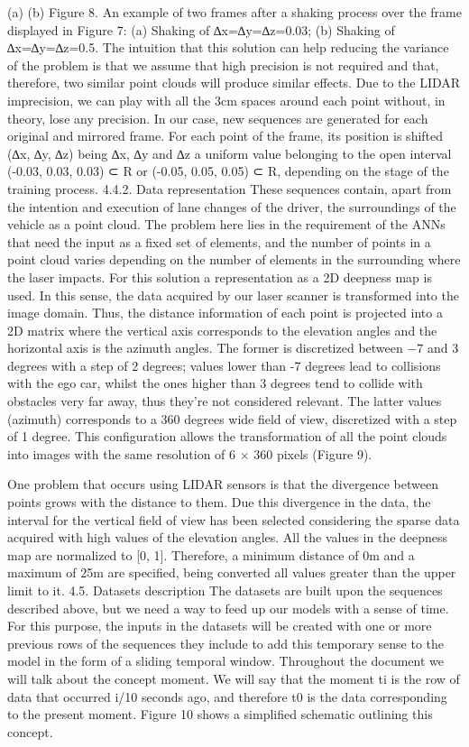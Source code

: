 (a)
(b)
Figure 8. An example of two frames after a shaking process over the frame displayed in Figure 7: (a) Shaking of ∆x=∆y=∆z=0.03; (b) Shaking of ∆x=∆y=∆z=0.5.
The intuition that this solution can help reducing the variance of the problem is that we assume that high precision is not required and that, therefore, two similar point clouds will produce similar effects. Due to the LIDAR imprecision, we can play with all the 3cm spaces around each point without, in theory, lose any precision.
In our case, new sequences are generated for each original and mirrored frame. For each point of the frame, its position is shifted (∆x, ∆y, ∆z) being ∆x, ∆y and ∆z a uniform value belonging to the open interval (-0.03, 0.03, 0.03) ⊂ R or (-0.05, 0.05, 0.05) ⊂ R, depending on the stage of the training process.
4.4.2. Data representation
These sequences contain, apart from the intention and execution of lane changes of the driver, the surroundings of the vehicle as a point cloud. The problem here lies in the requirement of the ANNs that need the input as a fixed set of elements, and the number of points in a point cloud varies depending on the number of elements in the surrounding where the laser impacts. For this solution a representation as a 2D deepness map is used.
In this sense, the data acquired by our laser scanner is transformed into the image domain. Thus, the distance information of each point is projected into a 2D matrix where the vertical axis corresponds to the elevation angles and the horizontal axis is the azimuth angles. The former is discretized between −7 and 3 degrees with a step of 2 degrees; values lower than -7 degrees lead to collisions with the ego car, whilst the ones higher than 3 degrees tend to collide with obstacles very far away, thus they’re not considered relevant. The latter values (azimuth) corresponds to a 360 degrees wide field of view, discretized with a step of 1 degree. This configuration allows the transformation of all the point clouds into images with the same resolution of 6 × 360 pixels (Figure 9).

One problem that occurs using LIDAR sensors is that the divergence between points grows with the distance to them. Due this divergence in the data, the interval for the vertical field of view has been selected considering the sparse data acquired with high values of the elevation angles.
All the values in the deepness map are normalized to [0, 1]. Therefore, a minimum distance of 0m and a maximum of 25m are specified, being converted all values greater than the upper limit to it.
4.5. Datasets description
The datasets are built upon the sequences described above, but we need a way to feed up our models with a sense of time. For this purpose, the inputs in the datasets will be created with one or more previous rows of the sequences they include to add this temporary sense to the model in the form of a sliding temporal window.
Throughout the document we will talk about the concept moment. We will say that the moment ti is the row of data that occurred i/10 seconds ago, and therefore t0 is the data corresponding to the present moment. Figure 10 shows a simplified schematic outlining this concept.


